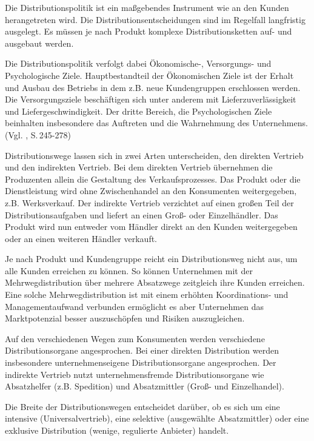         \noindent
        Die Distributionspolitik ist ein maßgebendes Instrument wie an den Kunden herangetreten wird. Die
        Distributionsentscheidungen sind im Regelfall langfristig ausgelegt. Es müssen je nach Produkt komplexe
        Distributionsketten auf- und ausgebaut werden.
    
        \noindent
        Die Distributionspolitik verfolgt dabei Ökonomische-, Versorgungs- und Psychologische Ziele. Hauptbestandteil der
        Ökonomischen Ziele ist der Erhalt und Ausbau des Betriebs in dem z.B. neue Kundengruppen erschlossen werden. Die
        Versorgungsziele beschäftigen sich unter anderem mit Lieferzuverlässigkeit und Liefergeschwindigkeit. Der dritte
        Bereich, die Psychologischen Ziele beinhalten insbesondere das Auftreten und die Wahrnehmung des Unternehmens.
        (Vgl. \cite{Bruhn2014}, S.\,245-278)
    
        \noindent
        Distributionswege lassen sich in zwei Arten unterscheiden, den direkten Vertrieb und den indirekten Vertrieb. Bei
        dem direkten Vertrieb übernehmen die Produzenten allein die Gestaltung des Verkaufsprozesses. Das Produkt oder die
        Dienstleistung wird ohne Zwischenhandel an den Konsumenten weitergegeben, z.B. Werksverkauf. Der indirekte Vertrieb
        verzichtet auf einen großen Teil der Distributionsaufgaben und liefert an einen Groß- oder Einzelhändler. Das
        Produkt wird nun entweder vom Händler direkt an den Kunden weitergegeben oder an einen weiteren Händler verkauft.
    
        \noindent
        Je nach Produkt und Kundengruppe reicht ein Distributionsweg nicht aus, um alle Kunden erreichen zu können. So
        können Unternehmen mit der Mehrwegdistribution über mehrere Absatzwege zeitgleich ihre Kunden erreichen. Eine solche
        Mehrwegdistribution ist mit einem erhöhten Koordinations- und Managementaufwand verbunden ermöglicht es aber
        Unternehmen das Marktpotenzial besser auszuschöpfen und Risiken auszugleichen.
    
        \noindent
        Auf den verschiedenen Wegen zum Konsumenten werden verschiedene Distributionsorgane angesprochen. Bei einer direkten
        Distribution werden insbesondere unternehmenseigene Distributionsorgane angesprochen. Der indirekte Vertrieb nutzt
        unternehmensfremde Distributionsorgane wie Absatzhelfer (z.B. Spedition) und Absatzmittler (Groß- und Einzelhandel).
    
        \noindent
        Die Breite der Distributionswegen entscheidet darüber, ob es sich um eine intensive (Universalvertrieb), eine
        selektive (ausgewählte Absatzmittler) oder eine exklusive Distribution (wenige, regulierte Anbieter) handelt.
    
